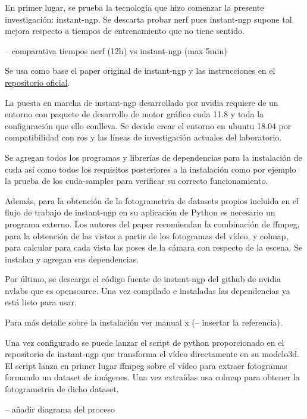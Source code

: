 \documentclass[a4paper, 12pt, spanish, twoside]{article}
\begin{document}
En primer lugar, se prueba la tecnología que hizo comenzar la presente investigación: \gls{instant-ngp}. Se descarta probar \acrshort{nerf} pues \gls{instant-ngp} supone tal mejora respecto a tiempos de entrenamiento que no tiene sentido.  

-- comparativa tiempos nerf (12h) vs instant-ngp (max 5min) 

Se usa como base el paper original de \gls{instant-ngp} y las instrucciones en el \href{https://github.com/NVlabs/instant-ngp}{repositorio oficial}.  

La puesta en marcha de \gls{instant-ngp} desarrollado por \gls{nvidia} requiere de un entorno con paquete de desarrollo de motor gráfico \acrshort{cuda} 11.8 y toda la configuración que ello conlleva. Se decide crear el entorno en \gls{ubuntu} 18.04 por compatibilidad con \acrshort{ros} y las líneas de investigación actuales del laboratorio. 

Se agregan todos los programas y librerías de dependencias para la instalación de \acrshort{cuda} así como todos los requisitos posteriores a la instalación como por ejemplo la prueba de los \gls{cuda-samples} para verificar su correcto funcionamiento. 

Además, para la obtención de la \gls{fotogrametria} de \glspl{dataset} propios incluida en el flujo de trabajo de \gls{instant-ngp} en su aplicación de Python es necesario un programa externo. Los autores del paper recomiendan la combinación de \gls{ffmpeg}, para la obtención de las vistas a partir de los fotogramas del vídeo, y \gls{colmap}, para calcular para cada vista las poses de la cámara con respecto de la escena. Se instalan y agregan sus dependencias. 

Por último, se descarga el código fuente de \gls{instant-ngp} del \gls{github} de \gls{nvidia} \gls{nvlabs} que es \gls{opensource}. Una vez compilado e instaladas las dependencias ya está listo para usar. 

Para más detalle sobre la instalación ver manual x (-- insertar la referencia). 

Una vez configurado se puede lanzar el script de \Gls{python} proporcionado en el repositorio de \gls{instant-ngp} que transforma el vídeo directamente en su \gls{modelo3d}. El script lanza en primer lugar \gls{ffmpeg} sobre el vídeo para extraer fotogramas formando un \gls{dataset} de imágenes. Una vez extraídas usa \gls{colmap} para obtener la \gls{fotogrametria} de dicho \gls{dataset}.  

-- añadir diagrama del proceso 
\end{document}
